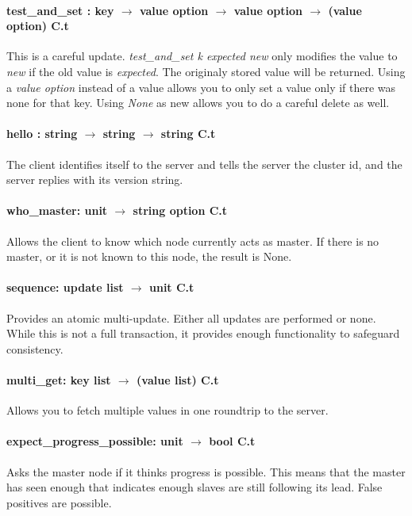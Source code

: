 \paragraph{test\_and\_set : key $\rightarrow$ value option $\rightarrow$ value option $\rightarrow$ (value option) C.t} This is a careful update.
\emph{test\_and\_set k expected new} only modifies the value to \emph{new} if the old value is \emph{expected}.
The originaly stored value will be returned.
Using a \emph{value option} instead of a value allows you to only set a value only if there was none for that key.
Using \emph{None} as new allows you to do a careful delete as well.
\paragraph{hello : string $\rightarrow$ string $\rightarrow$ string C.t}
The client identifies itself to the server and tells the server the cluster id, 
and the server replies with its version string.
\paragraph{who\_master: unit $\rightarrow$ string option C.t}
Allows the client to know which node currently acts as master.
If there is no master, or it is not known to this node, the result is None.
%

\paragraph{sequence: update list $\rightarrow$ unit C.t}
Provides an atomic multi-update. Either all updates are performed or none. 
While this is not a full transaction, it provides enough functionality to safeguard consistency.

\paragraph{multi\_get: key list $\rightarrow$ (value list) C.t}
Allows you to fetch multiple values in one roundtrip to the server.

\paragraph{expect\_progress\_possible: unit $\rightarrow$ bool C.t}
Asks the master node if it thinks progress is possible. 
This means that the master has seen enough that indicates enough slaves are still following its lead. 
False positives are possible.
